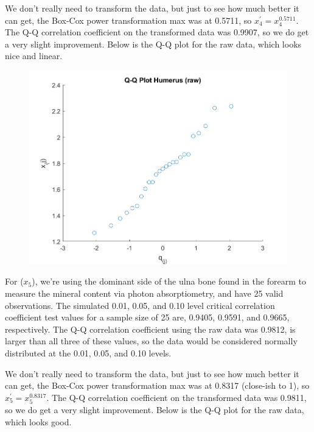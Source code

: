 We don't really need to transform the data, but just to see how much better it can get, the Box-Cox power transformation max was at 0.5711, so $x_{4}^{\prime} = x_{4}^{0.5711}$. The Q-Q correlation coefficient on the transformed data was 0.9907, so we do get a very slight improvement. Below is the Q-Q plot for the raw data, which looks nice and linear.

\begin{center}
    \begin{figure}[H]
        \centering
        \includegraphics[scale=0.6]{./matlab/chapter-4/sol4.34.qq.4.png}
    \end{figure}
\end{center}

For ($x_{5}$), we're using the dominant side of the ulna bone found in the forearm to measure the mineral content via photon absorptiometry, and have 25 valid observations. The simulated 0.01, 0.05, and 0.10 level critical correlation coefficient test values for a sample size of 25 are, 0.9405, 0.9591, and 0.9665, respectively. The Q-Q correlation coefficient using the raw data was 0.9812, is larger than all three of these values, so the data would be considered normally distributed at the 0.01, 0.05, and 0.10 levels.

We don't really need to transform the data, but just to see how much better it can get, the Box-Cox power transformation max was at 0.8317 (close-ish to 1), so $x_{5}^{\prime} = x_{5}^{0.8317}$. The Q-Q correlation coefficient on the transformed data was 0.9811, so we do get a very slight improvement. Below is the Q-Q plot for the raw data, which looks good.

